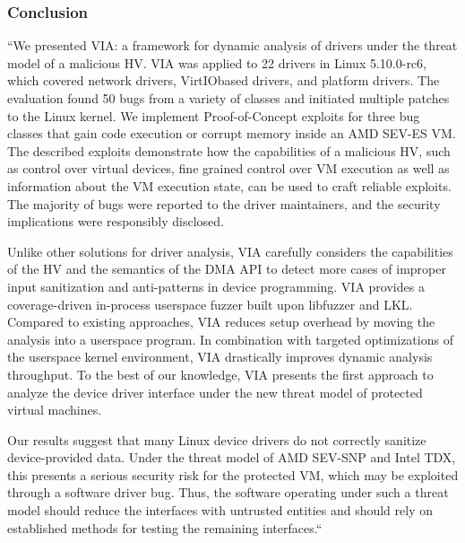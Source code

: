 \subsubsection*{Conclusion \cite{hetzelt_security_2017}}
“We presented VIA: a framework for dynamic analysis of drivers under the threat model of a malicious HV. VIA was applied to 22 drivers in Linux 5.10.0-rc6, which covered network drivers, VirtIObased drivers, and platform drivers. The evaluation found 50 bugs from a variety of classes and initiated multiple patches to the Linux kernel. We implement Proof-of-Concept exploits for three bug classes that gain code execution or corrupt memory inside an AMD SEV-ES VM. The described exploits demonstrate how the capabilities of a malicious HV, such as control over virtual devices, fine grained control over VM execution as well as information about the VM execution state, can be used to craft reliable exploits. The majority of bugs were reported to the driver maintainers, and the security implications were responsibly disclosed.

Unlike other solutions for driver analysis, VIA carefully considers the capabilities of the HV and the semantics of the DMA API to detect more cases of improper input sanitization and anti-patterns in device programming. VIA provides a coverage-driven in-process userspace fuzzer built upon libfuzzer and LKL. Compared to existing approaches, VIA reduces setup overhead by moving the analysis into a userspace program. In combination with targeted optimizations of the userspace kernel environment, VIA drastically improves dynamic analysis throughput. To the best of our knowledge, VIA presents the first approach to analyze the device driver interface under the new threat model of protected virtual machines.

Our results suggest that many Linux device drivers do not correctly sanitize device-provided data. Under the threat model of AMD SEV-SNP and Intel TDX, this presents a serious security risk for the protected VM, which may be exploited through a software driver bug. Thus, the software operating under such a threat model should reduce the interfaces with untrusted entities and should rely on established methods for testing the remaining interfaces.“
